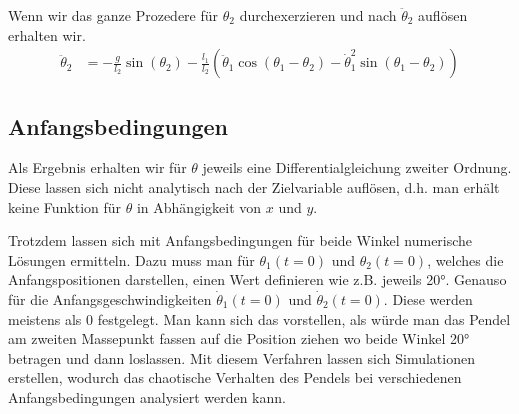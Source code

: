 Wenn wir das ganze Prozedere für \(\theta_2\) durchexerzieren und nach \(\ddot{\theta}_2\) auflösen
erhalten wir.
\begin{align}
    \ddot{\theta}_2 &= -\frac{g}{l_2} \sin(\theta_2) - \frac{l_1}{l_2} 
    \left(\ddot{\theta}_1 \cos(\theta_1-\theta_2) - \dot{\theta}_1^2 \sin(\theta_1-\theta_2) \right)
\end{align}

\subsection{Anfangsbedingungen}
Als Ergebnis erhalten wir für \(\theta\) jeweils eine Differentialgleichung zweiter Ordnung.
Diese lassen sich nicht analytisch nach der Zielvariable auflösen,
d.h. man erhält keine Funktion für \(\theta\) in Abhängigkeit von 
\(x\) und \(y\). 

Trotzdem lassen sich mit Anfangsbedingungen für beide Winkel numerische Lösungen ermitteln.
Dazu muss man für \(\theta_1(t=0)\) und \(\theta_2(t=0)\), welches die Anfangspositionen darstellen,
einen Wert definieren wie z.B. jeweils 20°. Genauso für die Anfangsgeschwindigkeiten \(\dot{\theta}_1(t=0)\)
und \(\dot{\theta}_2(t=0)\).
Diese werden meistens als 0 festgelegt. Man kann sich das vorstellen, als würde man das Pendel
am zweiten Massepunkt fassen auf die Position ziehen wo beide Winkel 20° betragen und dann loslassen.
Mit diesem Verfahren lassen sich Simulationen erstellen, wodurch das chaotische Verhalten
des Pendels bei verschiedenen Anfangsbedingungen analysiert werden kann.


